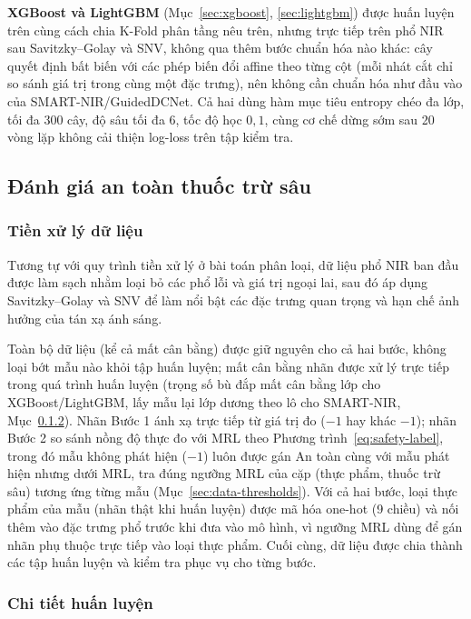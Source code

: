\documentclass[10pt,twocolumn,twoside]{article}
\begin{document}
\textbf{XGBoost và LightGBM} (Mục~\ref{sec:xgboost}, \ref{sec:lightgbm})
được huấn luyện trên cùng cách chia K-Fold phân tầng nêu trên, nhưng trực
tiếp trên phổ NIR sau Savitzky--Golay và SNV, không qua thêm bước chuẩn hóa
nào khác: cây quyết định bất biến với các phép biến đổi affine theo từng
cột (mỗi nhát cắt chỉ so sánh giá trị trong cùng một đặc trưng), nên không
cần chuẩn hóa như đầu vào của SMART-NIR/GuidedDCNet. Cả hai dùng hàm mục
tiêu entropy chéo đa lớp, tối đa 300 cây, độ sâu tối đa 6, tốc độ học
$0{,}1$, cùng cơ chế dừng sớm sau 20 vòng lặp không cải thiện log-loss trên
tập kiểm tra.

\subsection{Đánh giá an toàn thuốc trừ sâu}

\subsubsection{Tiền xử lý dữ liệu}
\label{sec:stage2-preprocess}

Tương tự với quy trình tiền xử lý ở bài toán phân loại, dữ liệu phổ NIR ban
đầu được làm sạch nhằm loại bỏ các phổ lỗi và giá trị ngoại lai, sau đó áp
dụng Savitzky--Golay và SNV để làm nổi bật các đặc trưng quan trọng và hạn
chế ảnh hưởng của tán xạ ánh sáng.

Toàn bộ dữ liệu (kể cả mất cân bằng) được giữ nguyên cho cả hai bước, không
loại bớt mẫu nào khỏi tập huấn luyện; mất cân bằng nhãn được xử lý trực tiếp
trong quá trình huấn luyện (trọng số bù đắp mất cân bằng lớp cho
XGBoost/LightGBM, lấy mẫu lại lớp dương theo lô cho SMART-NIR,
Mục~\ref{sec:stage-training}). Nhãn Bước 1 ánh xạ
trực tiếp từ giá trị đo ($-1$ hay khác $-1$); nhãn Bước 2 so sánh nồng độ
thực đo với MRL theo Phương trình~\ref{eq:safety-label}, trong đó mẫu không
phát hiện ($-1$) luôn được gán An toàn cùng với mẫu phát hiện nhưng dưới
MRL, tra đúng ngưỡng MRL của cặp (thực phẩm, thuốc trừ sâu) tương ứng từng
mẫu (Mục~\ref{sec:data-thresholds}). Với cả hai bước, loại thực phẩm của mẫu
(nhãn thật khi huấn luyện) được mã hóa one-hot (9 chiều) và nối thêm vào đặc
trưng phổ trước khi đưa vào mô hình, vì ngưỡng MRL dùng để gán nhãn phụ
thuộc trực tiếp vào loại thực phẩm. Cuối cùng, dữ liệu được chia thành các
tập huấn luyện và kiểm tra phục vụ cho từng bước.

\subsubsection{Chi tiết huấn luyện}
\label{sec:stage-training}
\end{document}
